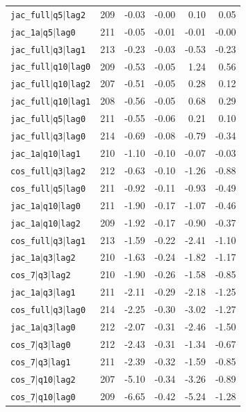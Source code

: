 \begin{longtable}{lrrrrr}
\texttt{jac\_full$\mid$q5$\mid$lag2} & 209 & -0.03 & -0.00 & 0.10 & 0.05 \\
\texttt{jac\_1a$\mid$q5$\mid$lag0} & 211 & -0.05 & -0.01 & -0.01 & -0.00 \\
\texttt{jac\_full$\mid$q3$\mid$lag1} & 213 & -0.23 & -0.03 & -0.53 & -0.23 \\
\texttt{jac\_full$\mid$q10$\mid$lag0} & 209 & -0.53 & -0.05 & 1.24 & 0.56 \\
\texttt{jac\_full$\mid$q10$\mid$lag2} & 207 & -0.51 & -0.05 & 0.28 & 0.12 \\
\texttt{jac\_full$\mid$q10$\mid$lag1} & 208 & -0.56 & -0.05 & 0.68 & 0.29 \\
\texttt{jac\_full$\mid$q5$\mid$lag0} & 211 & -0.55 & -0.06 & 0.21 & 0.10 \\
\texttt{jac\_full$\mid$q3$\mid$lag0} & 214 & -0.69 & -0.08 & -0.79 & -0.34 \\
\texttt{jac\_1a$\mid$q10$\mid$lag1} & 210 & -1.10 & -0.10 & -0.07 & -0.03 \\
\texttt{cos\_full$\mid$q3$\mid$lag2} & 212 & -0.63 & -0.10 & -1.26 & -0.88 \\
\texttt{cos\_full$\mid$q5$\mid$lag0} & 211 & -0.92 & -0.11 & -0.93 & -0.49 \\
\texttt{jac\_1a$\mid$q10$\mid$lag0} & 211 & -1.90 & -0.17 & -1.07 & -0.46 \\
\texttt{jac\_1a$\mid$q10$\mid$lag2} & 209 & -1.92 & -0.17 & -0.90 & -0.37 \\
\texttt{cos\_full$\mid$q3$\mid$lag1} & 213 & -1.59 & -0.22 & -2.41 & -1.10 \\
\texttt{jac\_1a$\mid$q3$\mid$lag2} & 210 & -1.63 & -0.24 & -1.82 & -1.17 \\
\texttt{cos\_7$\mid$q3$\mid$lag2} & 210 & -1.90 & -0.26 & -1.58 & -0.85 \\
\texttt{jac\_1a$\mid$q3$\mid$lag1} & 211 & -2.11 & -0.29 & -2.18 & -1.25 \\
\texttt{cos\_full$\mid$q3$\mid$lag0} & 214 & -2.25 & -0.30 & -3.02 & -1.27 \\
\texttt{jac\_1a$\mid$q3$\mid$lag0} & 212 & -2.07 & -0.31 & -2.46 & -1.50 \\
\texttt{cos\_7$\mid$q3$\mid$lag0} & 212 & -2.43 & -0.31 & -1.34 & -0.67 \\
\texttt{cos\_7$\mid$q3$\mid$lag1} & 211 & -2.39 & -0.32 & -1.59 & -0.85 \\
\texttt{cos\_7$\mid$q10$\mid$lag2} & 207 & -5.10 & -0.34 & -3.26 & -0.89 \\
\texttt{cos\_7$\mid$q10$\mid$lag0} & 209 & -6.65 & -0.42 & -5.24 & -1.28 \\

\end{longtable}
